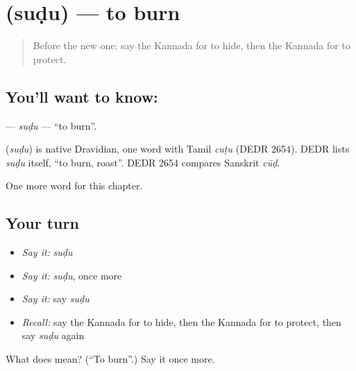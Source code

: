 \section[\texorpdfstring{\kn{ಸುಡು} (suḍu)}{ಸುಡು (suḍu)}]{ (suḍu) — to burn}

\label{lesson:KA-C151-sudu}



\begin{quote}
Before the new one: say the Kannada for to hide, then the Kannada for to protect.
\end{quote}

\subsection*{You'll want to know: }
\textbf{} — \emph{suḍu} — \textquotedblleft{}to burn\textquotedblright{}.

\begin{cousinweb}
\textbf{} (\emph{suḍu}) is native Dravidian, one word with Tamil \emph{cuṭu} (DEDR 2654). DEDR lists \emph{suḍu} itself, \textquotedblleft{}to burn, roast\textquotedblright{}. DEDR 2654 compares Sanskrit \emph{cūḍ}.
\end{cousinweb}

\begin{grammarlens}[title={What you've built}]
One more word for this chapter.
\end{grammarlens}

\subsection*{Your turn}
\begin{itemize}
\raggedright
  \item \emph{Say it:} \emph{suḍu}
  \item \emph{Say it:} \emph{suḍu}, once more
  \item \emph{Say it:} say \emph{suḍu}
  \item \emph{Recall:} say the Kannada for to hide, then the Kannada for to protect, then say \emph{suḍu} again
\end{itemize}

\begin{tcolorbox}[breakable,colback=teal!4,colframe=teal!35!black,title={Before you move on}]
What does  mean? (\textquotedblleft{}To burn\textquotedblright{}.) Say it once more.
\end{tcolorbox}
